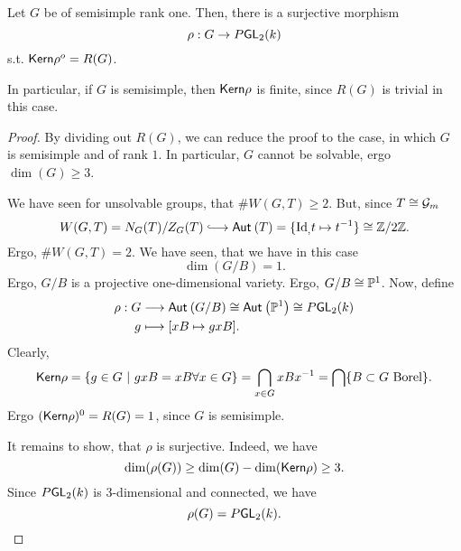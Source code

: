 \begin{proposition}
	Let $G$ be of semisimple rank one. Then, there is a surjective morphism
	\[ \rho : G \overset{}{\rightarrow} P\textsf{GL}_2(k) \]
	s.t. $\textsf{Kern} \rho^o = R(G)$.
	
	In particular, if $G$ is semisimple, then $\textsf{Kern} \rho$ is finite, since $R(G)$ is trivial in this case.
\end{proposition}
\begin{proof}
	By dividing out $R(G)$, we can reduce the proof to the case, in which $G$ is semisimple and of rank $1$. In particular, $G$ cannot be solvable, ergo $\dim(G) \geq 3$.
	
	We have seen for unsolvable groups, that $\# W(G,T) \geq 2$. But, since $T \overset{}{\cong} \mathcal{G}_m$
	\[ W(G,T) = N_G(T) / Z_G(T) \Inj{} \Aut{}{T} = \{ \id, t\mapsto t\i \} \isom{} \Z/2\Z. \]
	Ergo, $\# W(G,T) = 2$. We have seen, that we have in this case
	\[ \dim(G/B) = 1. \]
	Ergo, $G/B$ is a projective one-dimensional variety. Ergo, $G/B \overset{}{\cong} \mathbb{P}^1$.
	Now, define
	\begin{align*}
	\rho : G & \overset{}{\longrightarrow} \textsf{Aut}_{}\left(G/B\right) \overset{}{\cong} \textsf{Aut}_{}\left(\mathbb{P}^1\right) \overset{}{\cong} P\textsf{GL}_2(k)\\
	g & \longmapsto [xB \mapsto gxB].
	\end{align*}
	Clearly,
	\begin{align*}
	\textsf{Kern} \rho = \left\lbrace g\in G ~ | ~ gxB = xB \forall x \in G\right\rbrace = \bigcap_{x\in G}xBx^{-1} = \bigcap\{ B \subset G \text{ Borel}\}.
	\end{align*}
	Ergo $(\textsf{Kern} \rho)^0 = R(G) = 1$, since $G$ is semisimple.
	
	It remains to show, that $\rho$ is surjective. Indeed, we have
	\[ \dim(\rho(G)) \geq \dim(G) - \dim(\textsf{Kern} \rho) \geq 3. \]
	Since $P\textsf{GL}_2 (k)$ is 3-dimensional and connected, we have
	\[ \rho(G) = P\textsf{GL}_2(k). \qedhere \]
\end{proof}

